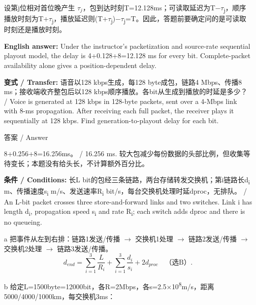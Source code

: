 设第j位相对首位晚产生 \(\tau_j\)，包到达时刻T=12.128ms；可读取延迟为T\ensuremath{-}\ensuremath{\tau}\textsubscript{j}，顺序播放时刻为T+\ensuremath{\tau}\textsubscript{j}，播放延迟则(T+\ensuremath{\tau}\textsubscript{j})\ensuremath{-}\ensuremath{\tau}\textsubscript{j}=T。因此，答题前要确定问的是可读取时刻还是播放时刻。


\textbf{English answer:} Under the instructor's packetization and source-rate sequential playout model, the delay is 4+0.128+8=12.128 ms for every bit. Complete-packet availability alone gives a position-dependent delay.


\textbf{变式 / Transfer:} 语音以128 kbps生成，每128 byte成包，链路4 Mbps、传播8 ms；接收端收齐整包后以128 kbps顺序播放。各bit从生成到播放的时延是多少？ / Voice is generated at 128 kbps in 128-byte packets, sent over a 4-Mbps link with 8-ms propagation. After receiving each full packet, the receiver plays it sequentially at 128 kbps. Find generation-to-playout delay for each bit.



\begin{StudySolution}{答案 / Answer}


8+0.256+8=16.256ms。 / 16.256 ms. 较大包减少每份数据的头部比例，但收集等待变长；本题没有给头长，不计算额外百分比。


\end{StudySolution}








\textbf{条件 / Conditions:} 长L bit的包经三条链路，两台存储转发交换机；第i链路长d\textsubscript{i} m、传播速度s\textsubscript{i} m/s、发送速率R\textsubscript{i} bit/s，每台交换机处理时延dproc，无排队。 / An L-bit packet crosses three store-and-forward links and two switches. Link i has length d\textsubscript{i}, propagation speed s\textsubscript{i} and rate R\textsubscript{i}; each switch adds dproc and there is no queueing.


a 把事件从左到右排：链路1发送/传播 \ensuremath{\to} 交换机1处理 \ensuremath{\to} 链路2发送/传播 \ensuremath{\to} 交换机2处理 \ensuremath{\to} 链路3发送/传播。
\[
d_{end}=\sum_{i=1}^3\frac L{R_i}+\sum_{i=1}^3\frac{d_i}{s_i}+2d_{proc}\quad\text{（选B）}.\tag{T2.1}
\]


b 给定L=1500byte=12000bit，各R=2Mbps，各s=2.5\ensuremath{\times}10\textsuperscript{8}m/s，距离5000/4000/1000km，每交换机3ms：


